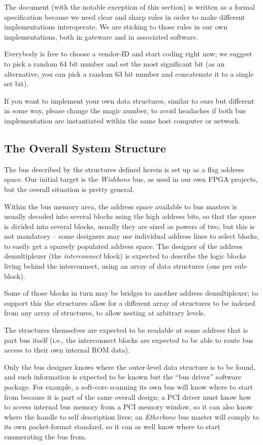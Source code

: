 \documentclass[a4paper, 12pt]{article}
\begin{document}
The document (with the notable exception of this section) is written
as a formal specification because we need clear and sharp rules in
order to make different implementations interoperate.  We are sticking
to those rules in our own implementations, both in gateware and in
associated software.

Everybody is free to choose a vendor-ID and start coding right now; we
suggest to pick a random 64 bit number and set the most significant
bit (as an alternative, you can pick a random 63 bit number and
concatenate it to a single set bit).

If you want to implement your own data structures, similar to ours
but different in some way, please change the magic number, to avoid
headaches if both bus implementation are instantiated within the same host
computer or network.

\subsection{The Overall System Structure}

The bus described by the structures defined herein is set up as a
flag address space. Our initial target is the \textit{Wishbone} bus,
as used in our own FPGA projects, but the overall situation is
pretty general.

Within the bus memory area, the address space available to bus masters
is usually decoded into several blocks using the high address bits, so
that the space is divided into several blocks, usually they are sized
as powers of two, but this is not mandatory -- some designers may use
individual address lines to select blocks, to easily get a sparsely
populated address space.  The designer of the address demultiplexer
(the \textit{interconnect} block) is expected to describe the
logic blocks living behind the interconnect, using an array
of data structures (one per sub-block).

Some of those blocks in turn may be bridges to another address
demultiplexer; to support this the structures allow for a different
array of structures to be indexed from any array of structures,
to allow nesting at arbitrary levels.

The structures themselves are expected to be readable at some address
that is part bus itself (i.e., the interconnect blocks are expected to
be able to route bus access to their own internal ROM data).

Only the bus designer knows where the outer-level data structure is to
be found, and such information is expected to be known but the ``bus
driver'' software package.  For example, a soft-core scanning its own
bus will know where to start from because it is part of the same
overall design; a PCI driver must know how to access internal bus
memory from a PCI memory window, so it can also know where the handle
to self description lives; an \textit{Etherbone} bus master will
comply to its own packet-format standard, so it can as well know
where to start enumerating the bus from.
\end{document}
